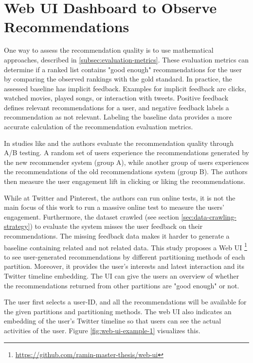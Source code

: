 \section{Web UI Dashboard to Observe Recommendations}
\label{sec:web-ui}
One way to assess the recommendation quality is to use mathematical approaches, described in \ref{subsec:evaluation-metrics}. These evaluation metrics can determine if a ranked list contains "good enough" recommendations for the user by comparing the observed rankings with the gold standard. In practice, the assessed baseline has implicit feedback. Examples for implicit feedback are clicks, watched movies, played songs, or interaction with tweets. Positive feedback defines relevant recommendations for a user, and negative feedback labels a recommendation as not relevant. Labeling the baseline data provides a more accurate calculation of the recommendation evaluation metrics.


In studies like \cite{eksombatchaiPixieSystemRecommending2018} and \cite{goelWhoToFollowSystemTwitter2015} the authors evaluate the recommendation quality through A/B testing. A random set of users experience the recommendations generated by the new recommender system (group A), while another group of users experiences the recommendations of the old recommendations system (group B). The authors then measure the user engagement lift in clicking or liking the recommendations. 


While at Twitter and Pinterest, the authors can run online tests, it is not the main focus of this work to run a massive online test to measure the users' engagement. Furthermore, the dataset crawled (see section \ref{sec:data-crawling-strategy}) to evaluate the system misses the user feedback on their recommendations. The missing feedback data makes it harder to generate a baseline containing related and not related data. This study proposes a Web UI \footnote{\url{https://github.com/ramin-master-thesis/web-ui}} to see user-generated recommendations by different partitioning methods of each partition. Moreover, it provides the user's interests and latest interaction and its Twitter timeline embedding. The UI can give the users an overview of whether the recommendations returned from other partitions are "good enough" or not.


The user first selects a user-ID, and all the recommendations will be available for the given partitions and partitioning methods. The web UI also indicates an embedding of the user's Twitter timeline so that users can see the actual activities of the user. Figure \ref{fig:web-ui-example-1} visualizes this.


